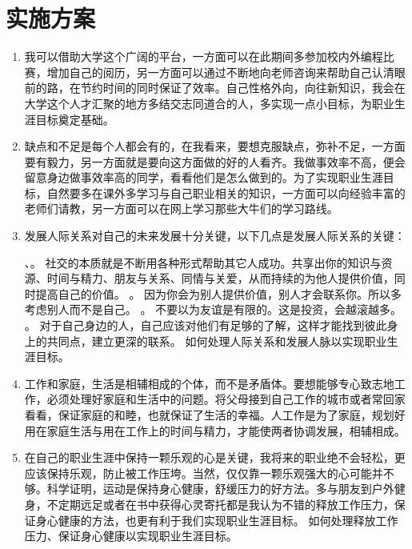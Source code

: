 \documentclass{article}
\begin{document}
\section{实施方案}

\begin{enumerate}[1、]
	\item 我可以借助大学这个广阔的平台，一方面可以在此期间多参加校内外编程比赛，增加自己的阅历，另一方面可以通过不断地向老师咨询来帮助自己认清眼前的路，在节约时间的同时保证了效率。自己性格外向，向往新知识，我会在大学这个人才汇聚的地方多结交志同道合的人，多实现一点小目标，为职业生涯目标奠定基础。
	\item 缺点和不足是每个人都会有的，在我看来，要想克服缺点，弥补不足，一方面要有毅力，另一方面就是要向这方面做的好的人看齐。我做事效率不高，便会留意身边做事效率高的同学，看看他们是怎么做到的。为了实现职业生涯目标，自然要多在课外多学习与自己职业相关的知识，一方面可以向经验丰富的老师们请教，另一方面可以在网上学习那些大牛们的学习路线。        
	\item    发展人际关系对自己的未来发展十分关键，以下几点是发展人际关系的关键：
		\begin{itemize}
	 、。
	社交的本质就是不断用各种形式帮助其它人成功。共享出你的知识与资源、时间与精力、朋友与关系、同情与关爱，从而持续的为他人提供价值，同时提高自己的价值。
	。
	因为你会为别人提供价值，别人才会联系你。所以多考虑别人而不是自己。
	。
	不要以为友谊是有限的。这是投资，会越滚越多。            
	。
	对于自己身边的人，自己应该对他们有足够的了解，这样才能找到彼此身上的共同点，建立更深的联系。         如何处理人际关系和发展人脉以实现职业生涯目标。
		\end{itemize}
	\item 
	工作和家庭，生活是相辅相成的个体，而不是矛盾体。要想能够专心致志地工作，必须处理好家庭和生活中的问题。将父母接到自己工作的城市或者常回家看看，保证家庭的和睦，也就保证了生活的幸福。人工作是为了家庭，规划好用在家庭生活与用在工作上的时间与精力，才能使两者协调发展，相辅相成。
	
	\item 
	在自己的职业生涯中保持一颗乐观的心是关键，我将来的职业绝不会轻松，更应该保持乐观，防止被工作压垮。当然，仅仅靠一颗乐观强大的心可能并不够。科学证明，运动是保持身心健康，舒缓压力的好方法。多与朋友到户外健身，不定期远足或者在书中获得心灵寄托都是我认为不错的释放工作压力，保证身心健康的方法，也更有利于我们实现职业生涯目标。
	如何处理释放工作压力、保证身心健康以实现职业生涯目标。
\end{enumerate}
\par
\end{document}

